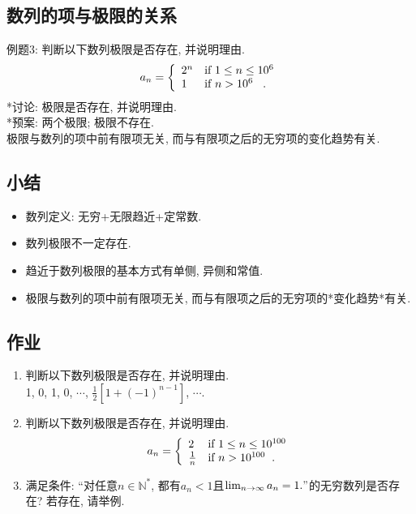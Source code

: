 \documentclass{article}
\begin{document}
\begin{CJK}{UTF8}{gkai}
\subsection{数列的项与极限的关系}
例题3: 判断以下数列极限是否存在, 并说明理由.\\
\begin{displaymath}
a_n = \left\{ \begin{array}{ll}
 2^n & \textrm{if $1 \le n \le 10^6$}\\
 1 & \textrm{if $n > 10^6$}\hspace{3mm}.\\
  \end{array} \right.
\end{displaymath}
*讨论: 极限是否存在, 并说明理由.\\
*预案: 两个极限; 极限不存在.\\
极限与数列的项中前有限项无关, 而与有限项之后的无穷项的变化趋势有关.\\

\subsection{小结}
\begin{itemize}
\item 数列定义: 无穷+无限趋近+定常数.
\item 数列极限不一定存在.
\item 趋近于数列极限的基本方式有单侧, 异侧和常值.
\item 极限与数列的项中前有限项无关, 而与有限项之后的无穷项的*变化趋势*有关.
\end{itemize}

\subsection{作业}
\begin{enumerate}
\item 判断以下数列极限是否存在, 并说明理由.\\1, 0, 1, 0, $\cdots$, $\frac{1}{2}[1+(-1)^{n-1}]$, $\cdots.$
\item 判断以下数列极限是否存在, 并说明理由.\\
\begin{displaymath}
a_n = \left\{ \begin{array}{ll}
 2 & \textrm{if $1 \le n \le 10^{100}$}\\
 \frac{1}{n} & \textrm{if $n > 10^{100}$}\hspace{2mm}.\\
  \end{array} \right.
\end{displaymath} 
\item 满足条件: ``对任意$n \in \mathbb{N}^*$, 都有$a_n < 1$且$ \lim_{n \to \infty}{a_n} = 1."$的无穷数列是否存在? 若存在, 请举例.
\end{enumerate}

\end{CJK}
\end{document}
